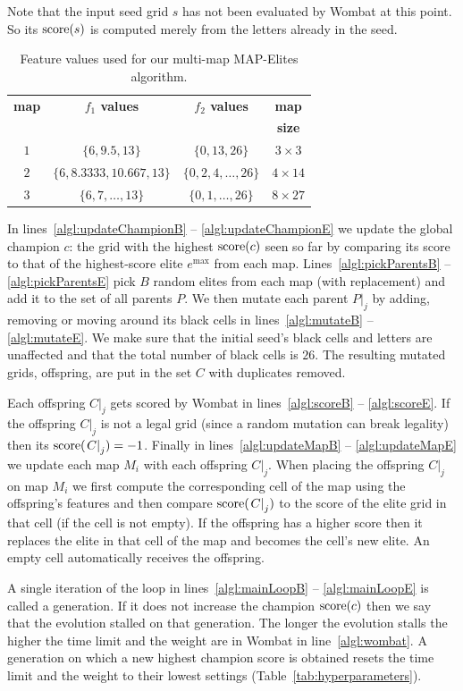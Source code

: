 Note that the input seed grid $s$ has not been evaluated by {\sc Wombat} at this point. So its $\operatorname{score}(s)$ is computed merely from the letters already in the seed.

\begin{table}[htbp]
\caption{Feature values used for our multi-map MAP-Elites algorithm.}
\label{tab:mrme}
{\small\centering
\begin{tabular}{c|c|c|c}
\toprule
{\bf map} & {\bf $f_1$ values} & {\bf $f_2$ values} & {\bf map} \\
          &                    &                    & {\bf size} \\
\midrule
$1$ & $\{6,9.5,13\}$ & $\{0,13,26\}$ & $3 \times 3$ \\
$2$ & $\{6,8.3333,10.667,13\}$ & $\{0,2,4,\dots,26\}$ & $4 \times 14$\\
$3$ & $\{6,7,\dots,13\}$ & $\{0,1,\dots,26\}$ & $8 \times 27$\\
\bottomrule
\end{tabular}}
\end{table}

In lines~\ref{algl:updateChampionB} -- \ref{algl:updateChampionE} we update the global champion $c$: the grid with the highest $\operatorname{score}(c)$ seen so far by comparing its score to that of the highest-score elite $e^{\max}$ from each map. Lines~\ref{algl:pickParentsB} -- \ref{algl:pickParentsE} pick $B$ random elites from each map (with replacement) and add it to the set of all parents $P$. We then mutate each parent $\left.P\right|_j$ by adding, removing or moving around its black cells in lines~\ref{algl:mutateB} -- \ref{algl:mutateE}. We make sure that the initial seed's black cells and letters are unaffected and that the total number of black cells is $26$. The resulting mutated grids, offspring, are put in the set $C$ with duplicates removed.

Each offspring $\left.C\right|_j$ gets scored by {\sc Wombat} in lines~\ref{algl:scoreB} -- \ref{algl:scoreE}. If the offspring $\left.C\right|_j$ is not a legal grid (since a random mutation can break legality) then its $\operatorname{score}(\left.C\right|_j) = -1$. Finally in lines~\ref{algl:updateMapB} -- \ref{algl:updateMapE} we update each map $M_i$ with each offspring $\left.C\right|_j$. When placing the offspring $\left.C\right|_j$ on map $M_i$ we first compute the corresponding cell of the map using the offspring's features and then compare $\operatorname{score}(\left.C\right|_j)$ to the score of the elite grid in that cell (if the cell is not empty). If the offspring has a higher score then it replaces the elite in that cell of the map and becomes the cell's new elite. An empty cell automatically receives the offspring.

A single iteration of the loop in lines~\ref{algl:mainLoopB} -- \ref{algl:mainLoopE} is called a generation. If it does not increase the champion $\operatorname{score}(c)$ then we say that the evolution stalled on that generation. The longer the evolution stalls the higher the time limit and the weight are in {\sc Wombat} in line~\ref{algl:wombat}. A generation on which a new highest champion score is obtained resets the time limit and the weight to their lowest settings (Table~\ref{tab:hyperparameters}).
